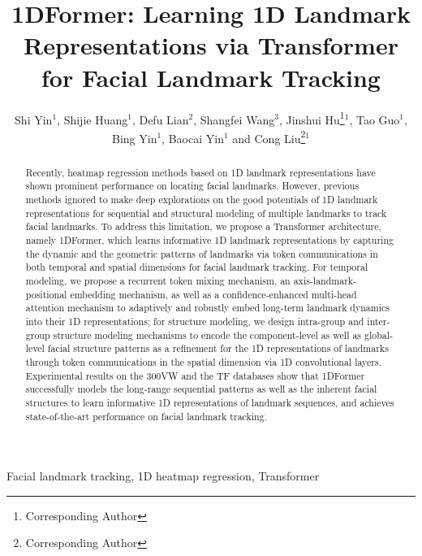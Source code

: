 \documentclass[review]{elsarticle}
\begin{document}
\begin{frontmatter}
\title{1DFormer: Learning 1D Landmark Representations via Transformer for Facial Landmark Tracking}
\author{Shi Yin$^1$, Shijie Huang$^1$, Defu Lian$^2$, Shangfei Wang$^3$, Jinshui Hu\thanks{Corresponding Author}$^1$, Tao Guo$^1$, Bing Yin$^1$, Baocai Yin$^1$ and Cong Liu\thanks{Corresponding Author}$^1$} 	
\address{$^1$iFLYTEK Research, Hefei City, Anhui Province, China, 230001\\
$^2$School of Data Science, University of Science and Technology of China\\
$^3$School of Computer Science and Technology, University of Science and Technology of China}

\begin{abstract}
	Recently, heatmap regression methods based on 1D landmark representations have shown prominent performance on locating facial landmarks.  However, previous  methods ignored to make deep explorations on the good potentials of 1D landmark representations for sequential and structural modeling of multiple landmarks to track facial landmarks. To address this limitation, we propose a Transformer architecture, namely 1DFormer, which learns informative 1D landmark representations by capturing the dynamic and the geometric patterns of landmarks via token communications in both temporal and spatial dimensions for facial landmark tracking. For temporal modeling, we propose a recurrent token mixing mechanism, an axis-landmark-positional embedding mechanism, as well as a confidence-enhanced multi-head attention mechanism to adaptively and robustly embed long-term landmark dynamics into their 1D representations; for structure modeling, we design intra-group and inter-group structure modeling mechanisms to encode the component-level as well as global-level facial structure patterns as a refinement for the 1D representations of landmarks through token communications in the spatial dimension via 1D convolutional layers. Experimental results on the 300VW and the TF databases show that 1DFormer successfully models the long-range sequential patterns as well as the inherent facial structures to learn informative 1D representations of landmark sequences, and achieves state-of-the-art performance on facial landmark tracking.
\end{abstract}
\begin{keyword}
Facial landmark tracking, 1D heatmap regression, Transformer
\end{keyword}
\end{frontmatter}
\end{document}
